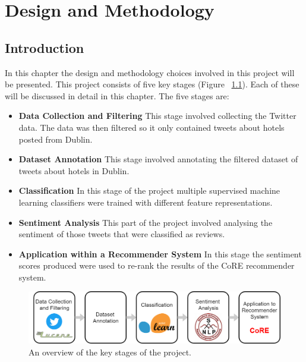 \chapter{Design and Methodology}

\section{Introduction}

In this chapter the design and methodology choices involved in this project will be presented. This project consists of five key stages (Figure ~\ref{fig:pipeline}). Each of these will be discussed in detail in this chapter. The five stages are:
\begin{itemize}
    \item \textbf{Data Collection and Filtering}\newline
    This stage involved collecting the Twitter data. The data was then filtered so it only contained tweets about hotels posted from Dublin.
    \item \textbf{Dataset Annotation}\newline
    This stage involved annotating the filtered dataset of tweets about hotels in Dublin.
    \item \textbf{Classification}\newline 
    In this stage of the project multiple supervised machine learning classifiers were trained with different feature representations.
    \item \textbf{Sentiment Analysis}\newline 
    This part of the project involved analysing the sentiment of those tweets that were classified as reviews.
    \item \textbf{Application within a Recommender System}\newline
    In this stage the sentiment scores produced were used to re-rank the results of the CoRE \cite{core2019} recommender system.
\end{itemize}

\begin{figure}[h!]
\centering
\includegraphics[width=1\textwidth]{design_and_methodology/pipeline.png}
\caption{\label{fig:pipeline} An overview of the key stages of the project.}
\end{figure}

